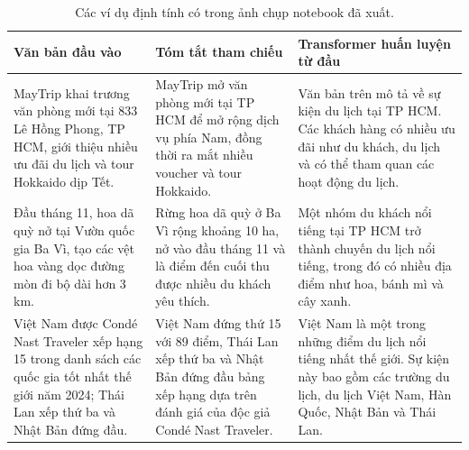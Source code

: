 \documentclass[conference]{IEEEtran}
\begin{document}
\begin{table}[htbp]
\centering
\caption{Các ví dụ định tính có trong ảnh chụp notebook đã xuất.}
\label{tab:qualitative}
\begin{tabular}{p{}p{}p{}}
\toprule
Văn bản đầu vào & Tóm tắt tham chiếu & Transformer huấn luyện từ đầu \\
\midrule
MayTrip khai trương văn phòng mới tại 833 Lê Hồng Phong, TP HCM, giới thiệu nhiều ưu đãi du lịch và tour Hokkaido dịp Tết. & MayTrip mở văn phòng mới tại TP HCM để mở rộng dịch vụ phía Nam, đồng thời ra mắt nhiều voucher và tour Hokkaido. & Văn bản trên mô tả về sự kiện du lịch tại TP HCM. Các khách hàng có nhiều ưu đãi như du khách, du lịch và có thể tham quan các hoạt động du lịch. \\
\midrule
Đầu tháng 11, hoa dã quỳ nở tại Vườn quốc gia Ba Vì, tạo các vệt hoa vàng dọc đường mòn đi bộ dài hơn 3 km. & Rừng hoa dã quỳ ở Ba Vì rộng khoảng 10 ha, nở vào đầu tháng 11 và là điểm đến cuối thu được nhiều du khách yêu thích. & Một nhóm du khách nổi tiếng tại TP HCM trở thành chuyến du lịch nổi tiếng, trong đó có nhiều địa điểm như hoa, bánh mì và cây xanh. \\
\midrule
Việt Nam được Condé Nast Traveler xếp hạng 15 trong danh sách các quốc gia tốt nhất thế giới năm 2024; Thái Lan xếp thứ ba và Nhật Bản đứng đầu. & Việt Nam đứng thứ 15 với 89 điểm, Thái Lan xếp thứ ba và Nhật Bản đứng đầu bảng xếp hạng dựa trên đánh giá của độc giả Condé Nast Traveler. & Việt Nam là một trong những điểm du lịch nổi tiếng nhất thế giới. Sự kiện này bao gồm các trường du lịch, du lịch Việt Nam, Hàn Quốc, Nhật Bản và Thái Lan. \\
\bottomrule
\end{tabular}
\end{table}
\end{document}

